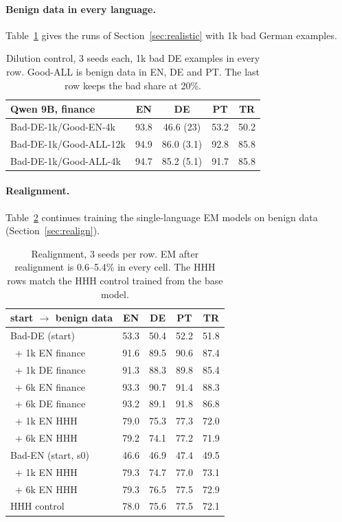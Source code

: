 \documentclass[11pt]{article}
\begin{document}
\paragraph{Benign data in every language.} Table~\ref{tab:dilution} gives the runs of Section~\ref{sec:realistic} with 1k bad German examples.

\begin{table}[!htb]
\centering\small
\setlength{\tabcolsep}{4pt}
\begin{tabular}{@{}lcccc@{}}
\toprule
Qwen 9B, finance & EN & DE & PT & TR \\
\midrule
Bad-DE-1k/Good-EN-4k & 93.8 & 46.6 (23) & 53.2 & 50.2 \\
Bad-DE-1k/Good-ALL-12k & 94.9 & 86.0 (3.1) & 92.8 & 85.8 \\
Bad-DE-1k/Good-ALL-4k & 94.7 & 85.2 (5.1) & 91.7 & 85.8 \\
\bottomrule
\end{tabular}
\caption{Dilution control, 3 seeds each, 1k bad DE examples in every row. Good-ALL is benign data in EN, DE and PT. The last row keeps the bad share at 20\%.}
\label{tab:dilution}
\end{table}

\paragraph{Realignment.} Table~\ref{tab:realign} continues training the single-language EM models on benign data (Section~\ref{sec:realign}).

\begin{table}[!htb]
\centering\small
\begin{tabular}{@{}lcccc@{}}
\toprule
start $\rightarrow$ benign data & EN & DE & PT & TR \\
\midrule
Bad-DE (start) & 53.3 & 50.4 & 52.2 & 51.8 \\
\ + 1k EN finance & 91.6 & 89.5 & 90.6 & 87.4 \\
\ + 1k DE finance & 91.3 & 88.3 & 89.8 & 85.4 \\
\ + 6k EN finance & 93.3 & 90.7 & 91.4 & 88.3 \\
\ + 6k DE finance & 93.2 & 89.1 & 91.8 & 86.8 \\
\ + 1k EN HHH & 79.0 & 75.3 & 77.3 & 72.0 \\
\ + 6k EN HHH & 79.2 & 74.1 & 77.2 & 71.9 \\
Bad-EN (start, s0) & 46.6 & 46.9 & 47.4 & 49.5 \\
\ + 1k EN HHH & 79.3 & 74.7 & 77.0 & 73.1 \\
\ + 6k EN HHH & 79.3 & 76.5 & 77.5 & 72.9 \\
\midrule
HHH control & 78.0 & 75.6 & 77.5 & 72.1 \\
\bottomrule
\end{tabular}
\caption{Realignment, 3 seeds per row. EM after realignment is 0.6--5.4\% in every cell. The HHH rows match the HHH control trained from the base model.}
\label{tab:realign}
\end{table}
\end{document}
